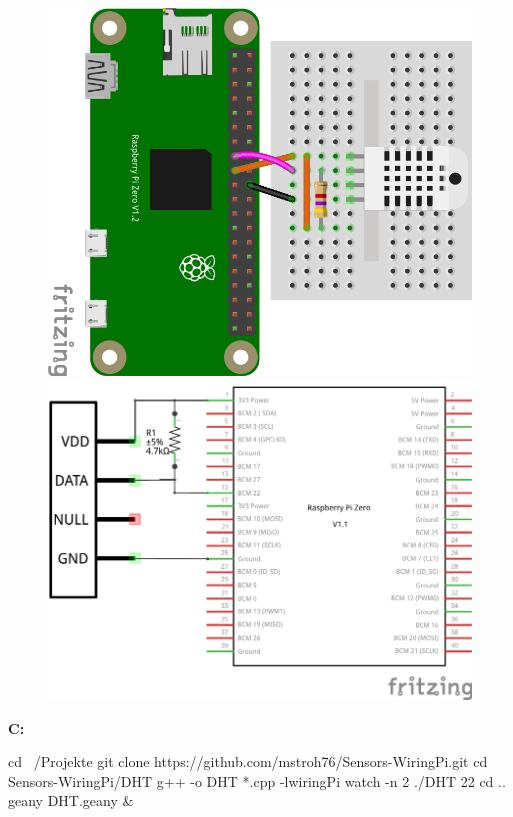 
\begin{figure}[ht]
  \centering
  \includegraphics[scale=0.24]{images/DHT22_Steckplatine.png}	
  \includegraphics[scale=0.25]{images/DHT22_Schaltplan.png}	
  \label{DHT22_Steckplatine}
\end{figure}




\textbf{C:}

\begin{console}
	cd ~/Projekte
	git clone https://github.com/mstroh76/Sensors-WiringPi.git
	cd Sensors-WiringPi/DHT
	g++ -o DHT *.cpp -lwiringPi	
	watch -n 2 ./DHT 22
	cd ..
	geany DHT.geany &
\end{console}

